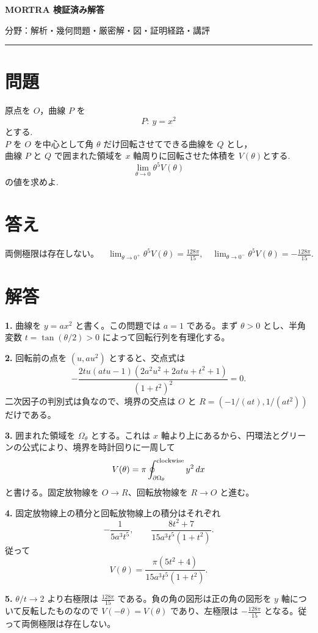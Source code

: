 \documentclass[uplatex,dvipdfmx,11pt]{jsarticle}
\begin{document}
\begin{center}
{\LARGE\bfseries MORTRA 検証済み解答\par}
\vspace{1mm}
{\small 分野：解析・幾何\qquad 問題・厳密解・図・証明経路・講評}
\end{center}
\vspace{1mm}
\hrule
\vspace{5mm}

\section*{問題}
原点を $O$，曲線 $P$ を
\[
  P:\ y = x^2
\]
とする.\\
$P$ を $O$ を中心として角 $\theta$ だけ回転させてできる曲線を $Q$ とし，\\
曲線 $P$ と $Q$ で囲まれた領域を $x$ 軸周りに回転させた体積を $V(\theta)$とする.
\[
  \lim_{\theta \to 0} \theta^5 V(\theta)
\]
 の値を求めよ.

\section*{答え}
\(\text{両側極限は存在しない。}\quad \lim_{\theta\to0^+}\theta^5V(\theta)=\frac{128 \pi}{15},\quad \lim_{\theta\to0^-}\theta^5V(\theta)=- \frac{128 \pi}{15}.\)

\section*{解答}
\textbf{1.} 曲線を \(y=ax^2\) と書く。この問題では \(a=1\) である。まず \(\theta>0\) とし、半角変数 \(t=\tan(\theta/2)>0\) によって回転行列を有理化する。

\textbf{2.} 回転前の点を \((u,au^2)\) とすると、交点式は \[-\frac{2tu(atu-1)(2a^2u^2+2atu+t^2+1)}{(1+t^2)^2}=0.\] 二次因子の判別式は負なので、境界の交点は \(O\) と \(R=(-1/(at),1/(at^2))\) だけである。

\textbf{3.} 囲まれた領域を \(\Omega_{\theta}\) とする。これは \(x\) 軸より上にあるから、円環法とグリーンの公式により、境界を時計回りに一周して \[V(\theta)=\pi\oint_{\partial\Omega_{\theta}}^{\rm clockwise}y^2\,dx\] と書ける。固定放物線を \(O\to R\)、回転放物線を \(R\to O\) と進む。

\textbf{4.} 固定放物線上の積分と回転放物線上の積分はそれぞれ \[-\frac1{5a^3t^5},\qquad \frac{8t^2+7}{15a^3t^5(1+t^2)}.\] 従って \[V(\theta)=\frac{\pi(5t^2+4)}{15a^3t^5(1+t^2)}.\]

\textbf{5.} \(\theta/t\to2\) より右極限は \(\frac{128 \pi}{15}\) である。負の角の図形は正の角の図形を \(y\) 軸について反転したものなので \(V(-\theta)=V(\theta)\) であり、左極限は \(- \frac{128 \pi}{15}\) となる。従って両側極限は存在しない。
\end{document}
